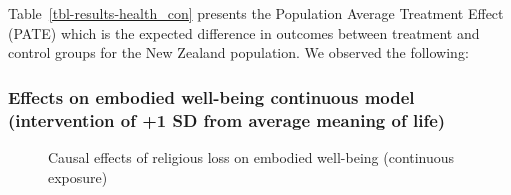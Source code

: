 \documentclass[
  singlecolumn,
  9pt]{scrartcl}
\begin{document}
Table~\ref{tbl-results-health_con} presents the Population Average
Treatment Effect (PATE) which is the expected difference in outcomes
between treatment and control groups for the New Zealand population. We
observed the following:

\subsubsection{Effects on embodied well-being continuous model
(intervention of +1 SD from average meaning of
life)}\label{effects-on-embodied-well-being-continuous-model-intervention-of-1-sd-from-average-meaning-of-life}

\begin{figure}


\caption{\label{fig-results-embodied_con}Causal effects of religious
loss on embodied well-being (continuous exposure)}

\end{figure}%
\end{document}
